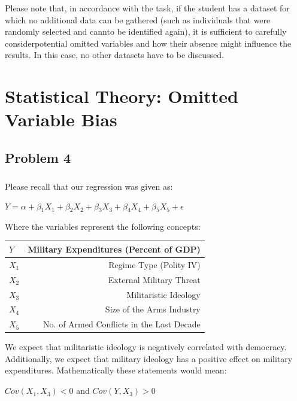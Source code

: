 \documentclass[12pt]{article}\usepackage[]{graphicx}\usepackage[]{color}
\begin{document}
Please note that, in accordance with the task, if the student has a dataset for which no additional data can be gathered (such as individuals that were randomly selected and cannto be identified again), it is sufficient to carefully considerpotential omitted variables and how their absence might influence the results. In this case, no other datasets have to be discussed.


\section*{Statistical Theory: Omitted Variable Bias}

\subsection*{Problem 4}

\subparagraph{} Please recall that our regression was given as:

$Y = \alpha + \beta{_1}X_1 + \beta{_2}X_2 + \beta{_3}X_3 + \beta{_4}X_4 + \beta{_5}X_5 + \epsilon$

\bigskip

Where the variables represent the following concepts:

\begin{center}
  \begin{tabular}{ | l | r | }
    \hline
    $Y$ & Military Expenditures (Percent of GDP) \\ \hline
    $X_1$ & Regime Type (Polity IV) \\ \hline
    $X_2$ & External Military Threat \\ \hline
    $X_3$ & Militaristic Ideology \\ \hline
    $X_4$ & Size of the Arms Industry \\ \hline
    $X_5$ & No. of Armed Conflicts in the Last Decade\\
    \hline
  \end{tabular}
\end{center}

\bigskip

We expect that militaristic ideology is negatively correlated with democracy. Additionally, we expect that military ideology has a positive effect on military expenditures. Mathematically these statements would mean:

\bigskip

$Cov(X_1, X_3) < 0$ and $Cov(Y, X_3) > 0$

\bigskip
\end{document}
